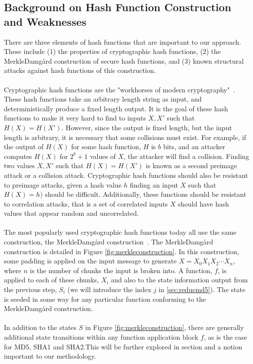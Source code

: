 \documentclass[letterpaper,twocolumn,10pt]{article}
\begin{document}
\subsection{Background on Hash Function Construction and Weaknesses} 
There are three elements of hash functions that are important to our approach. These include (1) the properties of cryptographic hash functions, (2) the Merkle{\textendash}Damg\r{a}rd construction of secure hash functions, and (3) known structural attacks against hash functions of this construction. 
\\
\\
Cryptographic hash functions are the "workhorses of modern cryptography"~\cite{bruce2004}. These hash functions take an arbitrary length string as input, and deterministically produce a fixed length output. It is the goal of these hash functions to make it very hard to find to inputs $X, X'$ such that $H(X) = H(X')$. However, since the output is fixed length, but the  input length is arbitrary, it is necessary that some collisions must exist. For example, if the output of $H(X)$ for some hash function, $H$ is $b$ bits, and an attacker computes $H(X)$ for $2^b + 1$ values of $X$, the attacker will find a collision. Finding two values $X, X'$ such that $H(X) = H(X')$ is known as a second preimage attack or a collision attack. Cryptographic hash functions should also be resistant to preimage attacks, given a hash value $h$ finding an input $X$ such that $H(X) = h)$ should be difficult. Additionally, these functions should be resistant to correlation attacks, that is a set of correlated inputs $X$ should have hash values that appear random and uncorrelated. 
\\
\\
The most popularly used cryptographic hash functions today all use the same construction, the Merkle{\textendash}Damg\r{a}rd construction~\cite{merkle1979secrecy, damgaard1989design, bruce2004}. The Merkle{\textendash}Damg\r{a}rd construction is detailed in Figure \ref{fig:merkleconstruction}. In this construction, some padding is applied on the input message to generate $X = X_0X_1X_2\cdots X_n$, where $n$ is the number of chunks the input is broken into. A function, $f$, is applied to each of these chunks, $X_i$ and also to the state information output from the previous step, $S_i$ (we will introduce the index $j$ in \ref{sec:reducmd5}). The state is seeded in some way for any particular function conforming to the Merkle{\textendash}Damg\r{a}rd construction. 
\\
\\
In addition to the states $S$ in Figure \ref{fig:merkleconstruction}, there are generally additional state transitions within any function application block $f$, as is the case for MD5, SHA1 and SHA2.This will be further explored in section \label{bbdef} and a notion important to our methodology. \\
\end{document}
